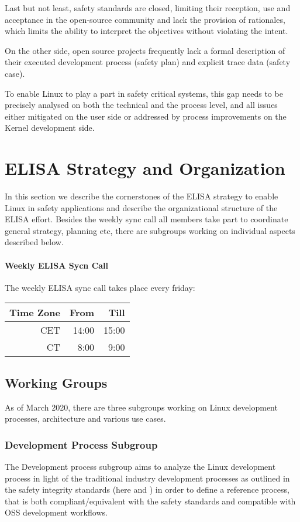 \documentclass[12pt]{ElisaPaper}
\begin{document}
Last but not least, safety standards are closed, limiting their reception, use and acceptance in the open-source community and lack the provision of rationales, which limits the ability to interpret the objectives without violating the intent.

On the other side, open source projects frequently lack a formal description of their executed development process (safety plan) and explicit trace data (safety case).

To enable Linux to play a part in safety critical systems, this gap needs to be precisely analysed on both the technical and the process level, and all issues either mitigated on the user side or addressed by process improvements on the Kernel development side.

\section{ELISA Strategy and Organization}
In this section we describe the cornerstones of the ELISA strategy to enable Linux in safety applications and describe the organizational structure of the ELISA effort.
Besides the weekly sync call all members take part to coordinate general strategy, planning etc, there are subgroups working on individual aspects described below.
\paragraph{Weekly ELISA Sycn Call}
The weekly ELISA sync call takes place every friday:
\begin{center}
	\begin{tabular}{rrr}
		\toprule
		Time Zone & From & Till\\
		\midrule
		CET	& 14:00 & 15:00 \\
		CT & 8:00 & 9:00 \\
		\bottomrule
	\end{tabular} 
\end{center}
\subsection{Working Groups}
As of March 2020, there are three subgroups working on Linux development processes, architecture and various use cases.
\subsubsection{Development Process Subgroup}
\label{sssec:Development Process Subgroup}
The Development process subgroup aims to analyze the Linux development process in light of the traditional industry development processes as outlined in the safety integrity standards (here \cite{IEC61508:2010} and \cite{ISO26262:2018}) in order to define a reference process, that is both compliant/equivalent with the safety standards and compatible with OSS development workflows.
\end{document}
